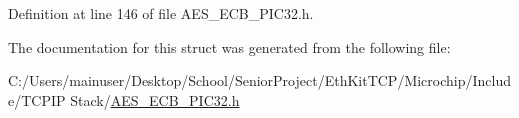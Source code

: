 Definition at line 146 of file A\+E\+S\+\_\+\+E\+C\+B\+\_\+\+P\+I\+C32.\+h.



The documentation for this struct was generated from the following file\+:\begin{DoxyCompactItemize}
\item 
C\+:/\+Users/mainuser/\+Desktop/\+School/\+Senior\+Project/\+Eth\+Kit\+T\+C\+P/\+Microchip/\+Include/\+T\+C\+P\+I\+P Stack/\hyperlink{_a_e_s___e_c_b___p_i_c32_8h}{A\+E\+S\+\_\+\+E\+C\+B\+\_\+\+P\+I\+C32.\+h}\end{DoxyCompactItemize}
